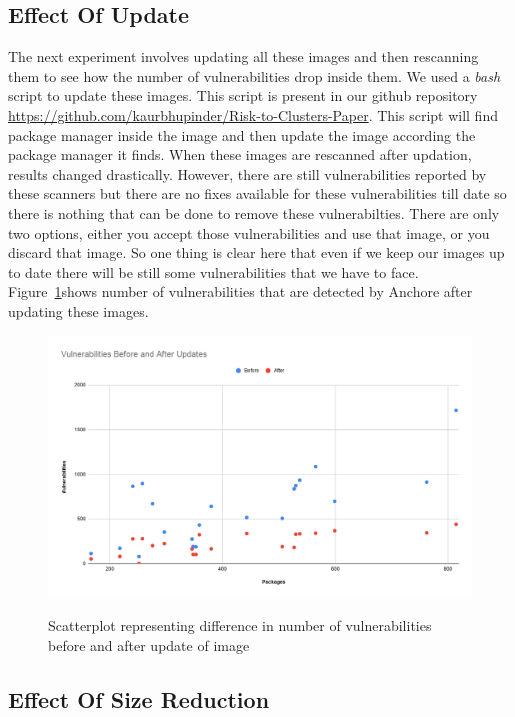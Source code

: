 \documentclass[a4paper,num-refs]{oup-contemporary}
\begin{document}
\subsection{Effect Of Update}

The next experiment involves updating all these images and then rescanning them to see how the number of
vulnerabilities drop inside them. We used a \textit{bash} script to update these images. This script is
present in our github repository \href{https://github.com/kaurbhupinder/Risk-to-Clusters-Paper}
{https://github.com/kaurbhupinder/Risk-to-Clusters-Paper}. This script 
will find package manager inside the image and then update the image according the package manager it finds.
When these images are rescanned after updation, results changed drastically. However, there are still
vulnerabilities reported by these scanners but there are no fixes available for these vulnerabilities
till date so there is nothing that can be done to remove these vulnerabilties. There are only two
options, either you accept those vulnerabilities and use that image, or you discard that image.
So one thing is clear here that even if we keep our images up to date there will be still some
vulnerabilities that we have to face.
Figure~\ref{fig:graph2}shows number of vulnerabilities that are detected by Anchore after updating these images.

\begin{figure}[!htb]
        {\includegraphics[width=\columnwidth]
        {Figures/aferupdatewithpackage.png}}
        \caption{\label{fig:graph2} Scatterplot representing difference in number of vulnerabilities before and 
	after update of image}
      \end{figure}
\subsection{Effect Of Size Reduction}


\end{document}
